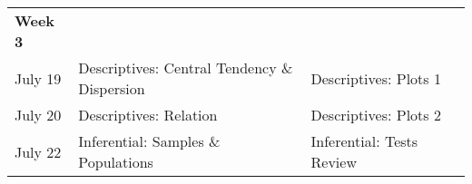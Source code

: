 \documentclass[
]{book}
\begin{document}
\begin{longtable}[]{@{}llll@{}}
\begin{minipage}[t]{0.09\columnwidth}\raggedright
\textbf{Week 3}\strut
\end{minipage} & \begin{minipage}[t]{0.32\columnwidth}\raggedright
\strut
\end{minipage} & \begin{minipage}[t]{0.29\columnwidth}\raggedright
\strut
\end{minipage} & \begin{minipage}[t]{0.18\columnwidth}\raggedright
\strut
\end{minipage}\tabularnewline
\begin{minipage}[t]{0.09\columnwidth}\raggedright
July 19\strut
\end{minipage} & \begin{minipage}[t]{0.32\columnwidth}\raggedright
Descriptives: Central Tendency \& Dispersion\strut
\end{minipage} & \begin{minipage}[t]{0.29\columnwidth}\raggedright
Descriptives: Plots 1\strut
\end{minipage} & \begin{minipage}[t]{0.18\columnwidth}\raggedright
\strut
\end{minipage}\tabularnewline
\begin{minipage}[t]{0.09\columnwidth}\raggedright
July 20\strut
\end{minipage} & \begin{minipage}[t]{0.32\columnwidth}\raggedright
Descriptives: Relation\strut
\end{minipage} & \begin{minipage}[t]{0.29\columnwidth}\raggedright
Descriptives: Plots 2\strut
\end{minipage} & \begin{minipage}[t]{0.18\columnwidth}\raggedright
\strut
\end{minipage}\tabularnewline
\begin{minipage}[t]{0.09\columnwidth}\raggedright
July 22\strut
\end{minipage} & \begin{minipage}[t]{0.32\columnwidth}\raggedright
Inferential: Samples \& Populations\strut
\end{minipage} & \begin{minipage}[t]{0.29\columnwidth}\raggedright
Inferential: Tests Review\strut
\end{minipage} & \begin{minipage}[t]{0.18\columnwidth}\raggedright

\end{minipage}
\end{longtable}
\end{document}
